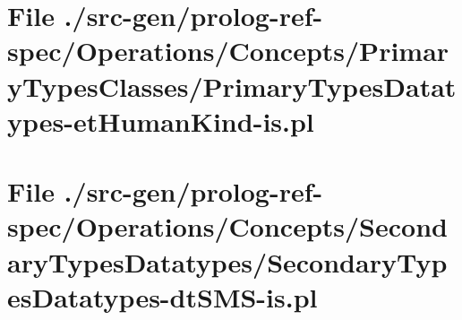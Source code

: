 \section[File /src-gen/prolog-ref-spec.../PrimaryTypesDatatypes-etHumanKind-is.pl]{File ./src-gen/prolog-ref-spec/Operations/Concepts/PrimaryTypesClasses/PrimaryTypesDatatypes-etHumanKind-is.pl}
\scriptsize

\normalsize
	
\section[File /src-gen/prolog-ref-spec/Operations.../SecondaryTypesDatatypes-dtSMS-is.pl]{File ./src-gen/prolog-ref-spec/Operations/Concepts/SecondaryTypesDatatypes/SecondaryTypesDatatypes-dtSMS-is.pl}
\scriptsize

\normalsize
	
